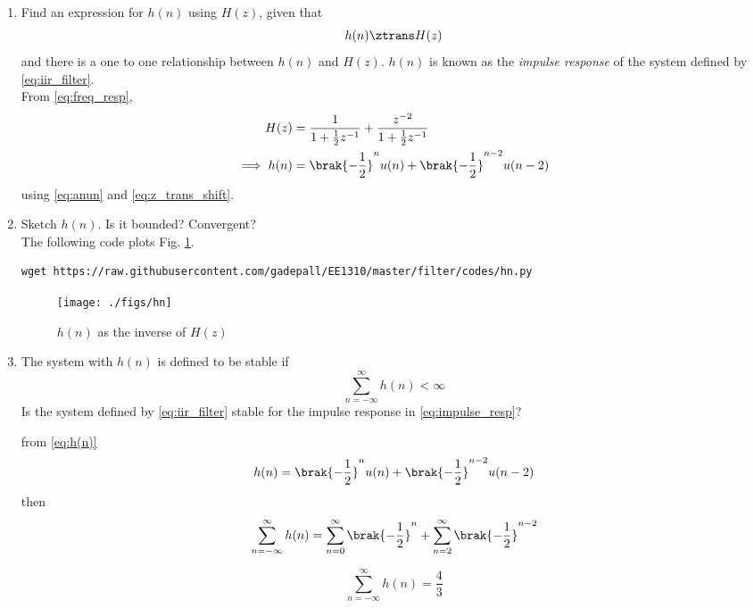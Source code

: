 \documentclass[journal,12pt,twocolumn]{IEEEtran}
\renewcommand\thesection{\arabic{section}}
\begin{document}
\begin{enumerate}[label=\thesection.\arabic*]
\item \label{prob:impulse_resp}
Find an expression for $h(n)$ using $H(z)$, given that 
\begin{equation}
\label{eq:impulse_resp}
h(n) \ztrans H(z)
\end{equation}
and there is a one to one relationship between $h(n)$ and $H(z)$. $h(n)$ is known as the {\em impulse response} of the
system defined by \eqref{eq:iir_filter}.
\\
\solution From \eqref{eq:freq_resp},\\
\begin{align}
H(z) &= \frac{1}{1 + \frac{1}{2}z^{-1}} + \frac{ z^{-2}}{1 + \frac{1}{2}z^{-1}}
\\
\implies h(n) &= \brak{-\frac{1}{2}}^{n}u(n) + \brak{-\frac{1}{2}}^{n-2}u(n-2) \label{eq:h(n)}
\end{align}
using \eqref{eq:anun} and \eqref{eq:z_trans_shift}.
\item Sketch $h(n)$. Is it bounded? Convergent? 
\\
\solution The following code plots Fig. \ref{fig:hn}.
\begin{lstlisting}
wget https://raw.githubusercontent.com/gadepall/EE1310/master/filter/codes/hn.py
\end{lstlisting}
\begin{figure}[!ht]
\centering
\texttt{[image: ./figs/hn]}
\caption{$h(n)$ as the inverse of $H(z)$}
\label{fig:hn}
\end{figure}
%
\item The system with $h(n)$ is defined to be stable if
\begin{equation}
\sum_{n=-\infty}^{\infty}h(n) < \infty
\end{equation}
Is the system defined by \eqref{eq:iir_filter} stable for the impulse response in \eqref{eq:impulse_resp}?
%

\solution from \ref{eq:h(n)}
\begin{equation}
    h(n) = \brak{-\frac{1}{2}}^{n}u(n) + \brak{-\frac{1}{2}}^{n-2}u(n-2) 
\end{equation}
then 
\begin{equation}
    \sum_{n=-\infty}^{\infty}h(n) = \sum_{n=0}^{\infty} \brak{-\frac{1}{2}}^{n} + \sum_{n=2}^{\infty} \brak{-\frac{1}{2}}^{n-2}
\end{equation}

\begin{equation}
    \sum_{n=-\infty}^{\infty}h(n) = \frac{4}{3}
\end{equation}


\end{enumerate}
\end{document}
